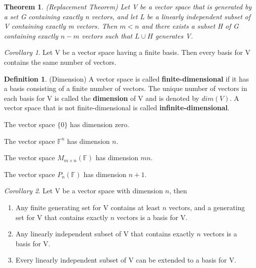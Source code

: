 \documentclass[12pt]{article}
\newtheorem{theorem}{Theorem}[section]
\theoremstyle{definition}
\newtheorem{definition}{Definition}[section]
\theoremstyle{remark}
\newtheorem{corollary}{Corollary}[theorem]
\begin{document}
    \begin{theorem}(Replacement Theorem)
        Let V be a vector space that is generated by a set G containing exactly n vectors, 
        and let L be a linearly independent subset of V containing exactly m vectors. 
        Then $m<n$ and there exists a subset H of G containing exactly $n-m$ vectors such that 
        $L \cup H$ generates V.
    \end{theorem}
    \begin{corollary}
        Let V be a vector space having a finite basis. Then every basis for V contains the 
        same number of vectors.
    \end{corollary}

    \begin{definition}(Dimension)
    A vector space is called \textbf{finite-dimensional} if it has a basis consisting 
    of a finite number of vectors. The unique number of vectors in each basis for V is called the 
    \textbf{dimension} of V and is denoted by $dim(V)$. A vector space that is not 
    finite-dimensional is called \textbf{infinite-dimensional}.
    \end{definition}

    \begin{example}
        The vector space $\{0\}$ has dimension zero.
    \end{example}
    \begin{example}
        The vector space $\mathbb{F}^n$ has dimension $n$.
    \end{example}
    \begin{example}
        The vector space $M_{m\times n}(\mathbb{F})$ has dimension $mn$.
    \end{example}
    \begin{example}
        The vector space $P_n(\mathbb{F})$ has dimension $n+1$.
    \end{example}

    \begin{corollary}
        Let V be a vector space with dimension $n$, then
        \begin{enumerate}
            \item Any finite generating set for V contains at least $n$ vectors, and a generating 
            set for V that contains exactly $n$ vectors is a basis for V.
            \item Any linearly independent subset of V that contains exactly $n$ vectors is a basis for V.
            \item Every linearly independent subset of V can be extended to a basis for V.
        \end{enumerate}
    \end{corollary}
\end{document}
